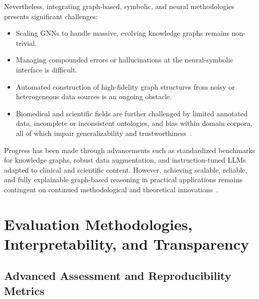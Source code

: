 Nevertheless, integrating graph-based, symbolic, and neural methodologies presents significant challenges:
\begin{itemize}
    \item Scaling GNNs to handle massive, evolving knowledge graphs remains non-trivial.
    \item Managing compounded errors or hallucinations at the neural-symbolic interface is difficult.
    \item Automated construction of high-fidelity graph structures from noisy or heterogeneous data sources is an ongoing obstacle.
    \item Biomedical and scientific fields are further challenged by limited annotated data, incomplete or inconsistent ontologies, and bias within domain corpora, all of which impair generalizability and trustworthiness~\cite{ref36,ref43,ref45,ref53,ref55,ref87,ref94}.
\end{itemize}
Progress has been made through advancements such as standardized benchmarks for knowledge graphs, robust data augmentation, and instruction-tuned LLMs adapted to clinical and scientific content. However, achieving scalable, reliable, and fully explainable graph-based reasoning in practical applications remains contingent on continued methodological and theoretical innovations~\cite{ref2,ref3,ref18,ref19,ref36,ref47,ref48,ref49,ref50,ref55,ref61,ref62,ref80,ref87,ref88,ref89,ref94,ref95}.

\section{Evaluation Methodologies, Interpretability, and Transparency}

\subsection{Advanced Assessment and Reproducibility Metrics}

